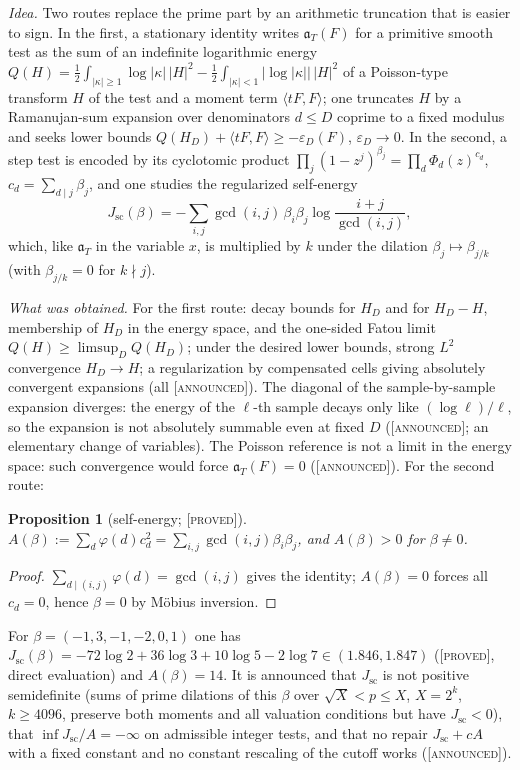 \documentclass[11pt]{amsart}
\newtheorem{proposition}[theorem]{Proposition}
\theoremstyle{definition}
\theoremstyle{remark}
\numberwithin{equation}{section}
\newcommand{\aT}{\mathfrak{a}_T}                       %
\newcommand{\stag}[1]{\textsc{[#1]}}
\newcommand{\PROVED}{\stag{proved}}
\newcommand{\ANNOUNCED}{\stag{announced}}
\newcommand{\entry}[1]{\par\smallskip\noindent\textit{#1.}\enspace}
\begin{document}
\entry{Idea} Two routes replace the prime part by an arithmetic truncation that is easier to sign. In the first, a stationary identity
writes $\aT(F)$ for a primitive smooth test as the sum of an indefinite logarithmic energy $Q(H)=\frac12\int_{|\kappa|\ge1}\log|\kappa|\,|H|^2-
\frac12\int_{|\kappa|<1}|\log|\kappa||\,|H|^2$ of a Poisson-type transform $H$ of the test and a moment term $\langle tF,F\rangle$; one truncates
$H$ by a Ramanujan-sum expansion over denominators $d\le D$ coprime to a fixed modulus and seeks lower bounds $Q(H_D)+\langle tF,F\rangle\ge-
\varepsilon_D(F)$, $\varepsilon_D\to0$. In the second, a step test is encoded by its cyclotomic product $\prod_j(1-z^j)^{\beta_j}=\prod_d\Phi_d(z)^{c_d}$,
$c_d=\sum_{d\mid j}\beta_j$, and one studies the regularized self-energy
\[
J_{\mathrm{sc}}(\beta)=-\sum_{i,j}\gcd(i,j)\,\beta_i\beta_j\log\frac{i+j}{\gcd(i,j)},
\]
which, like $\aT$ in the variable $x$, is multiplied by $k$ under the dilation $\beta_j\mapsto\beta_{j/k}$ (with $\beta_{j/k}=0$ for $k\nmid j$).

\entry{What was obtained} For the first route: decay bounds for $H_D$ and for $H_D-H$, membership of $H_D$ in the energy space, and the
one-sided Fatou limit $Q(H)\ge\limsup_DQ(H_D)$; under the desired lower bounds, strong $L^2$ convergence $H_D\to H$; a regularization by
compensated cells giving absolutely convergent expansions (all \ANNOUNCED). The diagonal of the sample-by-sample expansion diverges: the energy
of the $\ell$-th sample decays only like $(\log\ell)/\ell$, so the expansion is not absolutely summable even at fixed $D$ (\ANNOUNCED; an
elementary change of variables). The Poisson reference is not a limit in the energy space: such convergence
would force $\aT(F)=0$ (\ANNOUNCED). For the second route:

\begin{proposition}[self-energy; \PROVED]\label{w4:prop:selfenergy}
$A(\beta):=\sum_d\varphi(d)c_d^2=\sum_{i,j}\gcd(i,j)\beta_i\beta_j$, and $A(\beta)>0$ for $\beta\ne0$.
\end{proposition}

\begin{proof}
$\sum_{d\mid(i,j)}\varphi(d)=\gcd(i,j)$ gives the identity; $A(\beta)=0$ forces all $c_d=0$, hence $\beta=0$ by M\"obius inversion.
\end{proof}

For $\beta=(-1,3,-1,-2,0,1)$ one has $J_{\mathrm{sc}}(\beta)=-72\log2+36\log3+10\log5-2\log7\in(1.846,1.847)$ (\PROVED, direct evaluation) and
$A(\beta)=14$. It is announced that $J_{\mathrm{sc}}$ is not positive semidefinite (sums of prime dilations of this $\beta$ over
$\sqrt X<p\le X$, $X=2^k$, $k\ge4096$, preserve both moments and all valuation conditions but have $J_{\mathrm{sc}}<0$), that
$\inf J_{\mathrm{sc}}/A=-\infty$ on admissible integer tests, and that no repair $J_{\mathrm{sc}}+cA$ with a fixed constant and no constant rescaling of the
cutoff works (\ANNOUNCED).
\end{document}
